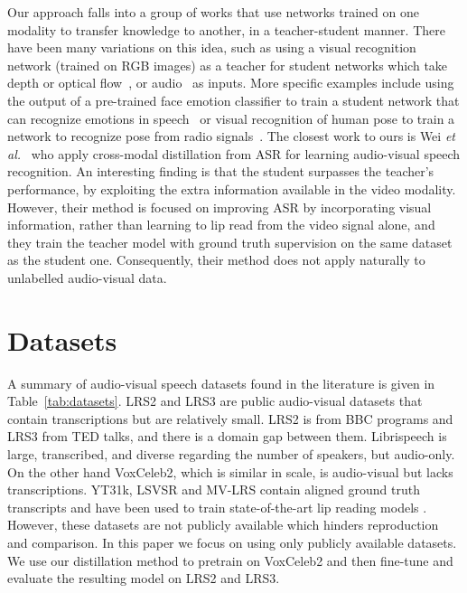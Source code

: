 \documentclass{article}
\def\newpara{\vspace{1pt}}
\def\psec{\vspace{-4pt}}
\begin{document}
\newpara{}
Our approach falls into a group of works that use networks trained on one modality to transfer knowledge to
another, in a teacher-student manner. There have been many variations on this idea, such as
using a visual recognition network (trained on RGB images) as a teacher for student networks which take
depth or optical flow~\cite{Gupta2016CrossMD}, or audio~\cite{aytar16soundnet} as inputs.
More specific examples include using 
the output of a pre-trained face emotion classifier to train a student network that can recognize emotions in speech~\cite{Albanie18}
or visual recognition of human pose to train  a network to
recognize pose from radio signals~\cite{Zhao18}.
The closest work to ours is Wei {\it et al.}~\cite{li2019improving} who 
apply cross-modal distillation from ASR for learning audio-visual speech recognition. 
An interesting finding is that the student surpasses the teacher's performance, by exploiting the extra
information available in the video modality.
However, their  method is focused on improving ASR by incorporating visual information, rather than learning
to lip read from the video signal alone, and they train the teacher model with ground truth supervision 
on the same dataset as the student one. Consequently,
their method does not apply naturally to unlabelled audio-visual data. 






 \psec\psec\psec
\section{Datasets} \label{sec:datasets} \psec
\psec
A summary of audio-visual speech datasets found in the literature is given in Table~\ref{tab:datasets}.
LRS2 and LRS3 are public audio-visual datasets that contain transcriptions but are relatively small.
LRS2 is from BBC programs and LRS3 from TED talks, and there is a domain gap between them.
Librispeech is large, transcribed, and diverse regarding the number of speakers,
but audio-only.
On the other hand VoxCeleb2, which is similar in scale, is audio-visual but lacks transcriptions.
YT31k, LSVSR and MV-LRS contain aligned
ground truth transcripts and have been used to
train state-of-the-art lip reading models \cite{makino2019recurrent, Shillingford18, Afouras19}. 
However, these datasets are not publicly available which hinders reproduction and comparison.
In this paper we focus on using only publicly available datasets. 
We use our distillation method to pretrain on VoxCeleb2 and then fine-tune and evaluate the
resulting model on LRS2 and LRS3.  
\end{document}
